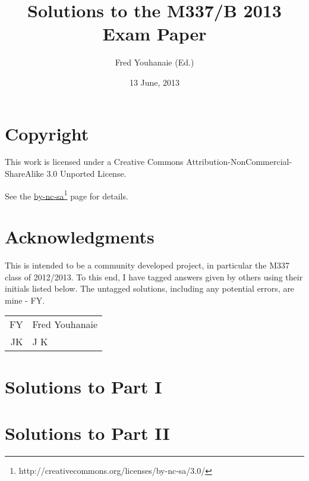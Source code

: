 \documentclass[a4paper,fleqn,12pt,twoside]{article}
\title{Solutions to the M337/B 2013 Exam Paper}
\author{Fred Youhanaie (Ed.)}
\date{13 June, 2013}
\begin{document}
\maketitle

\pagestyle{myheadings}

\section*{Copyright}

This work is licensed under a Creative Commons
Attribution-NonCommercial-ShareAlike 3.0 Unported License.

\newcommand\cclink{http://creativecommons.org/licenses/by-nc-sa/3.0/}
See the \href{\cclink}{by-nc-sa}\footnote{\cclink} page for details.

\section*{Acknowledgments}

This is intended to be a community developed project, in particular the
M337 class of 2012/2013. To this end, I have tagged answers given by
others using their initials listed below. The untagged solutions, including
any potential errors, are mine - FY.

\medskip

\begin{tabular}{r|l}
\hline
FY	& Fred Youhanaie \\
JK	& J K \\
\hline
\end{tabular}

\newpage
\section*{Solutions to Part I}

\newpage

\newpage

\newpage

\newpage

\newpage

\newpage

\newpage

\newpage

\section*{Solutions to Part II}

\newpage

\newpage

\newpage

\end{document}
